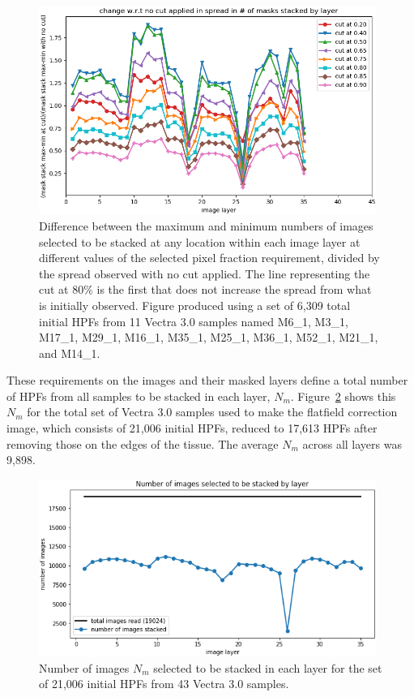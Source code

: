 \documentclass[letterpaper,11pt]{article}
\newcommand{\reffig}[1]{Figure~\ref{#1}}
\begin{document}
\begin{figure}[!ht]
\centering
\includegraphics[width=0.98\textwidth]{images/measuring_flatfield_corrections/example_mask_stack_spreads_by_layer}
\caption{\footnotesize Difference between the maximum and minimum numbers of images selected to be stacked at any location within each image layer at different values of the selected pixel fraction requirement, divided by the spread observed with no cut applied. The line representing the cut at 80\% is the first that does not increase the spread from what is initially observed. Figure produced using a set of 6,309 total initial HPFs from 11 Vectra 3.0 samples named M6\_1, M3\_1, M17\_1, M29\_1, M16\_1, M35\_1, M25\_1, M36\_1, M52\_1, M21\_1, and M14\_1.}
\label{fig:selected_pixel_fraction_cut_2}
\end{figure} 

These requirements on the images and their masked layers define a total number of HPFs from all samples to be stacked in each layer, $N_{m}$. \reffig{fig:n_images_stacked_by_layer} shows this $N_{m}$ for the total set of Vectra 3.0 samples used to make the flatfield correction image, which consists of 21,006 initial HPFs, reduced to 17,613 HPFs after removing those on the edges of the tissue. The average $N_{m}$ across all layers was 9,898.

\begin{figure}[!ht]
\centering
\includegraphics[width=0.98\textwidth]{images/measuring_flatfield_corrections/n_images_stacked_per_layer_vectra}
\caption{\footnotesize Number of images $N_{m}$ selected to be stacked in each layer for the set of 21,006 initial HPFs from 43 Vectra 3.0 samples.}
\label{fig:n_images_stacked_by_layer}
\end{figure}
\end{document}
